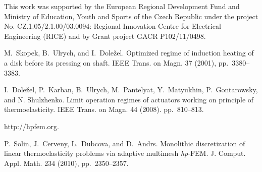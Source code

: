 This work was supported by the European Regional Development Fund and Ministry of Education, Youth and Sports of the Czech Republic under the project No. CZ.1.05/2.1.00/03.0094: Regional Innovation Centre for Electrical Engineering (RICE) and by Grant project GACR P102/11/0498.


\begin{thebibliography}{10}

{\sc M.~Skopek, B.~Ulrych, and I.~Dole\v{z}el}. {Optimized regime of induction heating of a disk before its pressing on shaft}. IEEE Trans. on Magn. 37 (2001), pp.~3380--3383.

{\sc I.~Dole\v{z}el, P.~Karban, B.~Ulrych, M.~Pantelyat, Y.~Matyukhin, P.~Gontarowsky, and N. Shulzhenko}. {Limit operation regimes of actuators working on principle of thermoelasticity}. IEEE Trans. on Magn. 44 (2008). pp.~810--813.

{http://hpfem.org}.

{\sc P.~Solin, J.~Cerveny, L.~Dubcova, and D.~Andrs}. {Monolithic discretization of linear thermoelasticity problems via adaptive multimesh \textit{hp}-FEM}. J. Comput. Appl. Math. 234 (2010), pp.~2350--2357.
\end{thebibliography}